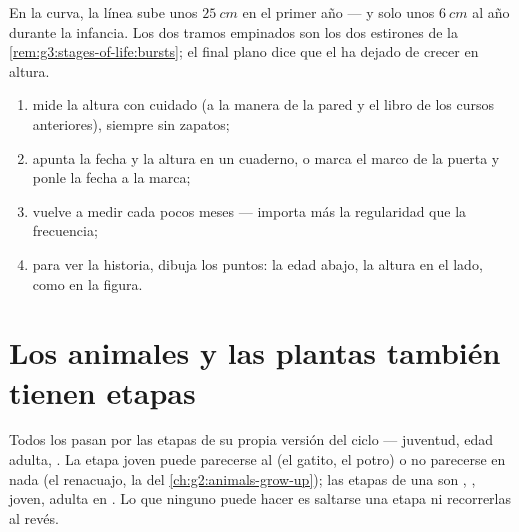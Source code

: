 \begin{example}\label{ex:g3:stages-of-life:reading}
En la curva, la línea sube unos $\qty{25}{cm}$ en el primer año --- y
solo unos $\qty{6}{cm}$ al año durante la infancia. Los dos tramos
empinados son los dos estirones de la
\cref{rem:g3:stages-of-life:bursts}; el final plano dice que el 
ha dejado de crecer en altura.
\end{example}

\begin{method}\label{met:g3:stages-of-life:keep}
\begin{enumerate}
  \item mide la altura con cuidado (a la manera de la pared y el libro
        de los cursos anteriores), siempre sin zapatos;
  \item apunta la fecha y la altura en un cuaderno, o marca el marco
        de la puerta y ponle la fecha a la marca;
  \item vuelve a medir cada pocos meses --- importa más la regularidad
        que la frecuencia;
  \item para ver la historia, dibuja los puntos: la edad abajo, la
        altura en el lado, como en la figura.
\end{enumerate}
\end{method}

\section{Los animales y las plantas también tienen etapas}

\begin{proposition}\label{prop:g3:stages-of-life:animals}
Todos los  pasan por las etapas de su propia versión del
ciclo --- juventud, edad adulta, . La etapa joven puede
parecerse al  (el gatito, el potro) o no parecerse en nada (el
renacuajo, la  del \cref{ch:g2:animals-grow-up}); las etapas de
una  son , ,  joven, adulta en . Lo que
ninguno puede hacer es saltarse una etapa ni recorrerlas al revés.
\end{proposition}
\admitted

